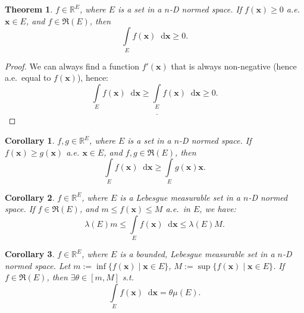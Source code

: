 \documentclass[openany]{book}
\theoremstyle{plain}
\newtheorem{theorem}{Theorem}[section] %
\newtheorem{corollary}{Corollary} %
\theoremstyle{definition}
\newcommand{\dif}{\mathop{}\!\mathrm{d}} %
\newcommand*{\bv}{\boldsymbol} %
\begin{document}
\begin{theorem}\label{theorem: the integral of a non-negative function is also non-negative}
	$f \in \mathbb R^E$, where $E$ is a set in a $n$-D normed space.
	If $f(\bv x) \geq 0$ a.e. $\bv x \in E$, and $f \in \mathfrak R(E)$, then
	\begin{equation*}
		\int\limits_E f(\bv x) \dif \bv x \geq 0.
	\end{equation*}
\end{theorem}
\begin{proof}
	We can always find a function $f'(\bv x)$ that is always non-negative (hence a.e.\ equal to $f(\bv x)$), hence:
	\begin{equation*}
		\int\limits_E f(\bv x) \dif \bv x 
			\geq \underline{\int\limits_E} f(\bv x) \dif \bv x \geq 0.
	\end{equation*}
\end{proof}

\begin{corollary}
	$f, g \in \mathbb R^E$, where $E$ is a set in a $n$-D normed space.
	If $f(\bv x) \geq g(\bv x)$ a.e. $\bv x \in E$, and $f, g \in \mathfrak R(E)$, then
	\begin{equation*}
		\int\limits_E f(\bv x) \dif \bv x \geq \int\limits_E g(\bv x) \bv x.
	\end{equation*}
\end{corollary}

\begin{corollary}\label{corollary: integral average}
	$f \in \mathbb R^E$, where $E$ is a Lebesgue measurable set in a $n$-D normed space. 
	If $f \in \mathfrak R(E)$, and $m \leq f(\bv x) \leq M$ a.e.\ in $E$, we have:
	\begin{equation*}
		\lambda(E) m \leq \int\limits_E f(\bv x) \dif \bv x \leq \lambda(E) M.
	\end{equation*}
\end{corollary}

\begin{corollary}
	$f \in \mathbb R^E$, where $E$ is a bounded, Lebesgue measurable set in a $n$-D normed space. 
	Let $m := \inf\{f(\bv x) \mid \bv x \in E\}$, $M := \sup\{f(\bv x) \mid \bv x \in E\}$.
	If $f \in \mathfrak R(E)$, then $\exists \theta \in [m, M]$ s.t.\ 
	\begin{equation*}
		\int\limits_E f(\bv x) \dif \bv x = \theta \mu(E).
	\end{equation*}
\end{corollary}
\end{document}
